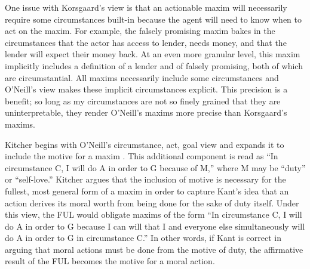 \begin{isabellebody}
\begin{isamarkuptext}
One issue with Korsgaard's view is that an actionable maxim will necessarily
require some circumstances built-in because the agent will need to know when to act on the maxim. For example,
the falsely promising maxim bakes in the circumstances that the actor has access to lender, needs money, 
and that the lender will expect their money back. At an even more granular level, this maxim implicitly includes
a definition of a lender and of falsely promising, both of which are circumstantial. All
maxims necessarily include some circumstances and  O'Neill's view makes these implicit circumstances
explicit. This precision is a benefit; so long as my circumstances are not so finely grained that they
are uninterpretable, they render O'Neill's maxims more precise than Korsgaard's maxims.%
\end{isamarkuptext}\isamarkuptrue%
%
\isadelimdocument
%
\endisadelimdocument
%
\isatagdocument
%
\isamarkuptrue%
%
\endisatagdocument
{\isafolddocument}%
%
\isadelimdocument
%
\endisadelimdocument
%
\begin{isamarkuptext}%
Kitcher begins with O'Neill's 
circumstance, act, goal view and expands it to include the motive for a maxim \citep{whatisamaxim}. 
This additional component is read as ``In circumstance C, I will do A in order to G because of M,'' 
where M may be ``duty'' or ``self-love.'' Kitcher argues that the inclusion of motive is necessary 
for the fullest, most general form of a maxim in order to capture Kant's idea that an action derives 
its moral worth from being done for the sake of duty itself. Under this view, the FUL would obligate maxims of the form 
``In circumstance C, I will do A in order to G because I can will that I and everyone else simultaneously
will do A in order to G in circumstance C.'' In other words, if Kant is correct in arguing that moral 
actions must be done from the motive of duty, the affirmative result of the FUL becomes 
the motive for a moral action.


\end{isamarkuptext}
\end{isabellebody}
